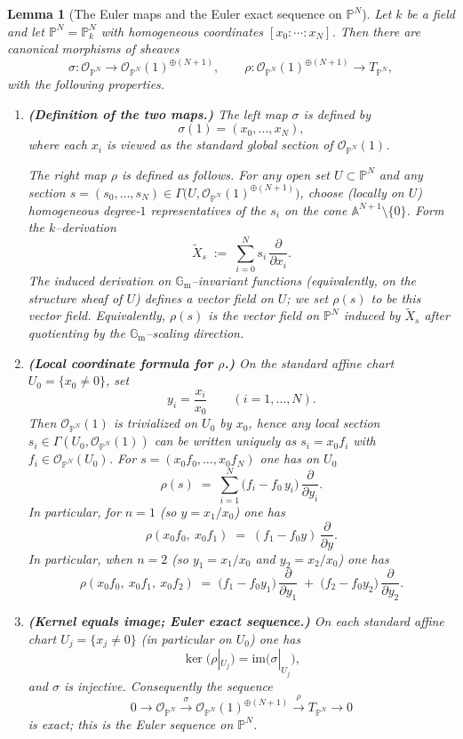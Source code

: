 \documentclass[11pt]{article}
\theoremstyle{plain}
\newtheorem{lemma}{Lemma}
\newcommand{\PP}{\mathbb{P}}
\newcommand{\OO}{\mathcal{O}}
\newcommand{\Gm}{\mathbb{G}_{\mathrm{m}}}
\begin{document}
\begin{lemma}[The Euler maps and the Euler exact sequence on $\PP^N$]\label{lem:Euler-sequence-maps}
Let $k$ be a field and let $\PP^N=\PP^N_k$ with homogeneous coordinates
$[x_0:\cdots:x_N]$.  Then there are canonical morphisms of sheaves
\[
\sigma:\OO_{\PP^N}\longrightarrow \OO_{\PP^N}(1)^{\oplus (N+1)},
\qquad
\rho:\OO_{\PP^N}(1)^{\oplus (N+1)}\longrightarrow T_{\PP^N},
\]
with the following properties.

\begin{enumerate}
\item[(i)] \textbf{(Definition of the two maps.)}
The left map $\sigma$ is defined by
\[
\sigma(1)=(x_0,\dots,x_N),
\]
where each $x_i$ is viewed as the standard global section of $\OO_{\PP^N}(1)$.

The right map $\rho$ is defined as follows.  For any open set $U\subset \PP^N$ and
any section $s=(s_0,\dots,s_N)\in \Gamma\!\big(U,\OO_{\PP^N}(1)^{\oplus(N+1)}\big)$,
choose (locally on $U$) homogeneous degree-$1$ representatives of the $s_i$ on the
cone $\mathbb{A}^{N+1}\setminus\{0\}$.  Form the $k$--derivation
\[
\widetilde{X}_s \;:=\; \sum_{i=0}^N s_i\,\frac{\partial}{\partial x_i}.
\]
The induced derivation on $\Gm$--invariant functions (equivalently, on the structure
sheaf of $U$) defines a vector field on $U$; we set $\rho(s)$ to be this vector field.
Equivalently, $\rho(s)$ is the vector field on $\PP^N$ induced by $\widetilde{X}_s$
after quotienting by the $\Gm$--scaling direction.

\item[(ii)] \textbf{(Local coordinate formula for $\rho$.)}
On the standard affine chart $U_0=\{x_0\neq 0\}$, set
\[
y_i=\frac{x_i}{x_0}\qquad (i=1,\dots,N).
\]
Then $\OO_{\PP^N}(1)$ is trivialized on $U_0$ by $x_0$, hence any local section
$s_i\in \Gamma(U_0,\OO_{\PP^N}(1))$ can be written uniquely as $s_i=x_0 f_i$ with
$f_i\in \OO_{\PP^N}(U_0)$.  For $s=(x_0 f_0,\dots,x_0 f_N)$ one has on $U_0$
\[
\rho(s)
\;=\;
\sum_{i=1}^N \bigl(f_i-f_0\,y_i\bigr)\,\frac{\partial}{\partial y_i}.
\]
In particular, for $n=1$ (so $y=x_1/x_0$) one has
\[
\rho(x_0 f_0,\ x_0 f_1) \;=\; (f_1-f_0 y)\,\frac{\partial}{\partial y}.
\]
In particular, when $n=2$ (so $y_1=x_1/x_0$ and $y_2=x_2/x_0$) one has
\[
\rho(x_0 f_0,\ x_0 f_1,\ x_0 f_2)
\;=\;
\bigl(f_1-f_0 y_1\bigr)\,\frac{\partial}{\partial y_1}
\;+\;
\bigl(f_2-f_0 y_2\bigr)\,\frac{\partial}{\partial y_2}.
\]
\item[(iii)] \textbf{(Kernel equals image; Euler exact sequence.)}
On each standard affine chart $U_j=\{x_j\neq 0\}$ (in particular on $U_0$) one has
\[
\ker\!\bigl(\rho|_{U_j}\bigr)=\mathrm{im}\!\bigl(\sigma|_{U_j}\bigr),
\]
and $\sigma$ is injective.  Consequently the sequence
\[
0\longrightarrow \OO_{\PP^N}
\xrightarrow{\ \sigma\ }
\OO_{\PP^N}(1)^{\oplus(N+1)}
\xrightarrow{\ \rho\ }
T_{\PP^N}
\longrightarrow 0
\]
is exact; this is the Euler sequence on $\PP^N$.
\end{enumerate}
\end{lemma}
\end{document}
